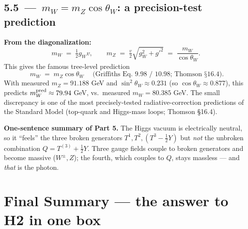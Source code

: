 \documentclass[11pt]{article}
\begin{document}
\subsection*{5.5 \,---\, $m_W = m_Z \cos\theta_W$: a precision-test prediction}

\begin{resultbox}
\textbf{From the diagonalization:}
\[
m_W \;=\; \tfrac{1}{2} g_W v,
\qquad
m_Z \;=\; \tfrac{v}{2}\sqrt{g_W^2 + g'^2} \;=\; \frac{m_W}{\cos\theta_W} .
\]
This gives the famous tree-level prediction
\[
\boxed{\; m_W \;=\; m_Z \cos\theta_W \;}
\quad\text{(Griffiths Eq.~9.98 / 10.98; Thomson §16.4).}
\]
With measured $m_Z = 91.188$ GeV and $\sin^2\theta_W \approx 0.231$ (so $\cos\theta_W \approx 0.877$),
this predicts $m_W^{\rm pred} \approx 79.94$ GeV, vs.\ measured $m_W = 80.385$ GeV. The
small discrepancy is one of the most precisely-tested radiative-correction predictions of
the Standard Model (top-quark and Higgs-mass loops; Thomson §16.4).
\end{resultbox}

\begin{intuitionbox}
\textbf{One-sentence summary of Part 5.} The Higgs vacuum is electrically neutral, so it
``feels'' the three broken generators $T^1, T^2, (T^3 - \tfrac{1}{2}Y)$ but \emph{not} the
unbroken combination $Q = T^{(3)} + \tfrac{1}{2} Y$. Three gauge fields couple to broken
generators and become massive ($W^\pm, Z$); the fourth, which couples to $Q$, stays massless
--- and \emph{that} is the photon.
\end{intuitionbox}

\newpage

\section*{Final Summary --- the answer to H2 in one box}
\end{document}

